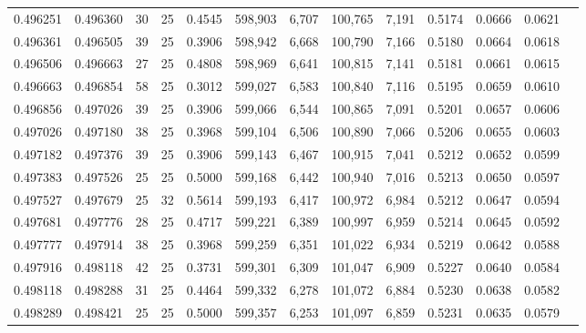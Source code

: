 \begin{tabular}{rrrrrrrrrrrrr}
0.496251 & 0.496360 &    30 &  25 &                                     0.4545 & 598,903 &   6,707 & 100,765 &   7,191 & 0.5174 & 0.0666 & 0.0621 \\
0.496361 & 0.496505 &    39 &  25 &                                     0.3906 & 598,942 &   6,668 & 100,790 &   7,166 & 0.5180 & 0.0664 & 0.0618 \\
0.496506 & 0.496663 &    27 &  25 &                                     0.4808 & 598,969 &   6,641 & 100,815 &   7,141 & 0.5181 & 0.0661 & 0.0615 \\
0.496663 & 0.496854 &    58 &  25 &                                     0.3012 & 599,027 &   6,583 & 100,840 &   7,116 & 0.5195 & 0.0659 & 0.0610 \\
0.496856 & 0.497026 &    39 &  25 &                                     0.3906 & 599,066 &   6,544 & 100,865 &   7,091 & 0.5201 & 0.0657 & 0.0606 \\
0.497026 & 0.497180 &    38 &  25 &                                     0.3968 & 599,104 &   6,506 & 100,890 &   7,066 & 0.5206 & 0.0655 & 0.0603 \\
0.497182 & 0.497376 &    39 &  25 &                                     0.3906 & 599,143 &   6,467 & 100,915 &   7,041 & 0.5212 & 0.0652 & 0.0599 \\
0.497383 & 0.497526 &    25 &  25 &                                     0.5000 & 599,168 &   6,442 & 100,940 &   7,016 & 0.5213 & 0.0650 & 0.0597 \\
0.497527 & 0.497679 &    25 &  32 &                                     0.5614 & 599,193 &   6,417 & 100,972 &   6,984 & 0.5212 & 0.0647 & 0.0594 \\
0.497681 & 0.497776 &    28 &  25 &                                     0.4717 & 599,221 &   6,389 & 100,997 &   6,959 & 0.5214 & 0.0645 & 0.0592 \\
0.497777 & 0.497914 &    38 &  25 &                                     0.3968 & 599,259 &   6,351 & 101,022 &   6,934 & 0.5219 & 0.0642 & 0.0588 \\
0.497916 & 0.498118 &    42 &  25 &                                     0.3731 & 599,301 &   6,309 & 101,047 &   6,909 & 0.5227 & 0.0640 & 0.0584 \\
0.498118 & 0.498288 &    31 &  25 &                                     0.4464 & 599,332 &   6,278 & 101,072 &   6,884 & 0.5230 & 0.0638 & 0.0582 \\
0.498289 & 0.498421 &    25 &  25 &                                     0.5000 & 599,357 &   6,253 & 101,097 &   6,859 & 0.5231 & 0.0635 & 0.0579 \\

\end{tabular}
